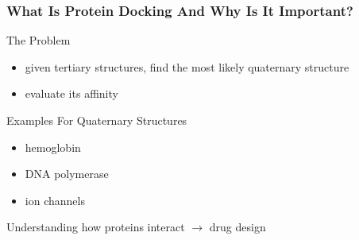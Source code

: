 \documentclass{beamer}
\begin{document}

\begin{frame}
\frametitle{What Is Protein Docking And Why Is It Important?}
\begin{block}{The Problem}
\begin{itemize}
	\item given tertiary structures, find the most likely quaternary structure
	\item evaluate its affinity
\end{itemize}
\end{block}

\begin{block}{Examples For Quaternary Structures}
\begin{itemize}
	\item hemoglobin
	\item DNA polymerase
	\item ion channels
\end{itemize}
Understanding how proteins interact $\rightarrow$ drug design
\end{block}
\end{frame}

\end{document}
